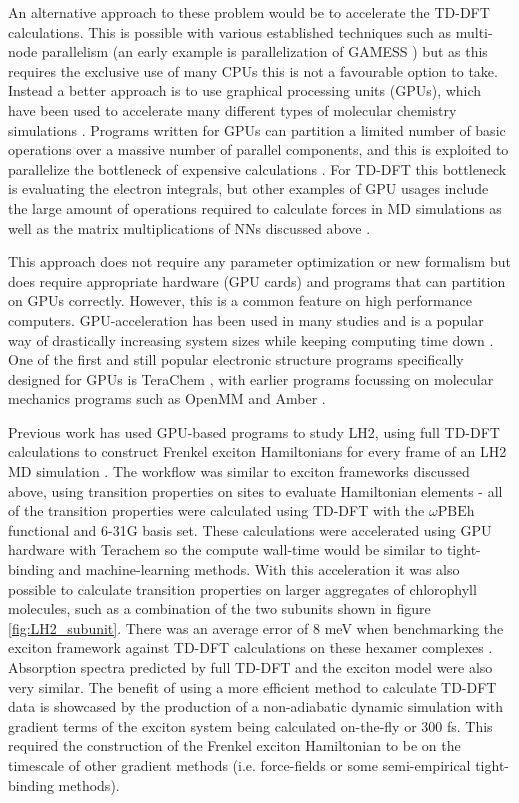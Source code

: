 An alternative approach to these problem would be to accelerate the TD-DFT calculations.
This is possible with various established techniques such as multi-node parallelism
(an early example is parallelization of GAMESS \cite{Fletcher2000}) but as this 
requires the exclusive use of many CPUs this is not a favourable option to take.
Instead a better approach is to use graphical processing units (GPUs), which have
been used to accelerate many different types of molecular chemistry simulations \cite{Pandey2022}. 
Programs written for GPUs can partition a limited number of basic operations over 
a massive number of parallel components, and this is exploited to parallelize the
bottleneck of expensive calculations \cite{McIntosh-Smith2013}. For TD-DFT this 
bottleneck is evaluating the electron integrals, but other examples of GPU usages 
include the large amount of operations required to calculate forces in MD simulations 
as well as the matrix multiplications of NNs discussed above \cite{Ufimtsev2008, Friedrichs2009, Wu2012}.

This approach does not require any parameter optimization or new formalism but does
require appropriate hardware (GPU cards) and programs that can partition on GPUs
correctly. However, this is a common feature on high performance computers. GPU-acceleration
has been used in many studies and is a popular way of drastically increasing system 
sizes while keeping computing time down \cite{Seritan2021}. One of the first and 
still popular electronic structure programs specifically designed for GPUs is TeraChem
\cite{Seritan2020}, with earlier programs focussing on molecular mechanics programs 
such as OpenMM \cite{Eastman2017} and Amber \cite{Salomon-Ferrer2013}.

Previous work has used GPU-based programs to study LH2, using full TD-DFT calculations
to construct Frenkel exciton Hamiltonians for every frame of an LH2 MD simulation \cite{Sisto2014a, Sisto2017}.
The workflow was similar to exciton frameworks discussed above, using transition
properties on sites to evaluate Hamiltonian elements - all of the transition properties
were calculated using TD-DFT with the $\omega\text{PBEh}$ functional and 6-31G basis
set. These calculations were accelerated using GPU hardware with Terachem so the
compute wall-time would be similar to tight-binding and machine-learning methods. 
With this acceleration it was also possible to calculate transition properties on
larger aggregates of chlorophyll molecules, such as a combination of the two subunits
shown in figure \ref{fig:LH2_subunit}. There was an average error of 8 meV when
benchmarking the exciton framework against TD-DFT calculations on these hexamer
complexes \cite{Sisto2014a}. Absorption spectra predicted by full TD-DFT and the
exciton model were also very similar. The benefit of using a more efficient method
to calculate TD-DFT data is showcased by the production of a non-adiabatic dynamic
simulation with gradient terms of the exciton system being calculated on-the-fly
or 300 fs. This required the construction of the Frenkel exciton Hamiltonian to
be on the timescale of other gradient methods (i.e. force-fields or some semi-empirical 
tight-binding methods).

